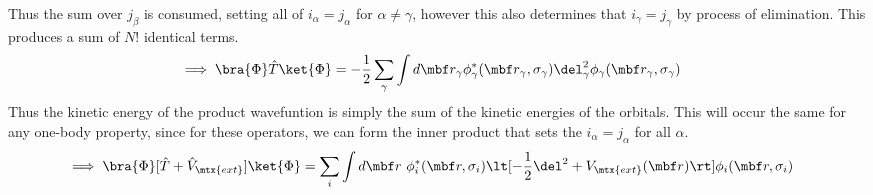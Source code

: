 \documentclass[10pt]{article}
\begin{document}
  Thus the sum over $j_\beta$ is consumed, setting all of $i_\alpha = j_\alpha$
  for $\alpha \ne \gamma$, however this also determines that $i_\gamma = j_\gamma$
  by process of elimination. This produces a sum of $N!$ identical terms.
  \begin{align*}
    \implies
    \bra{\Phi} \hat T \ket{\Phi}
    &=
    -\frac12 
    \sum_\gamma
    \int d\mbf r_\gamma
    \phi_\gamma^*(\mbf r_\gamma, \sigma_\gamma)
    \del_\gamma^2 \phi_\gamma(\mbf r_\gamma, \sigma_\gamma)
  \end{align*}
  Thus the kinetic energy of the product wavefuntion is simply the sum of the
  kinetic energies of the orbitals. This will occur the same for any one-body
  property, since for these operators, we can form the inner product that sets the
  $i_\alpha = j_\alpha$ for all $\alpha$.
  \begin{align*}
    \implies
    \bra{\Phi}[ \hat T + \hat V_\mtx{ext} ]\ket{\Phi}
    &=
    \sum_i \int d\mbf r~
    \phi_i^*(\mbf r,\sigma_i)
    \lt[
      -\frac12 \del^2 + V_\mtx{ext}(\mbf r)
    \rt]
    \phi_i(\mbf r,\sigma_i)
  \end{align*}
\end{document}
